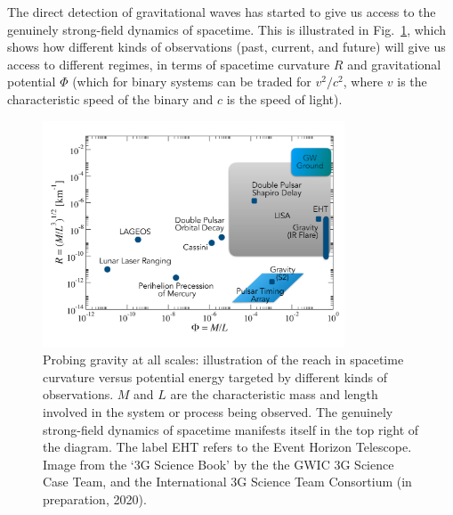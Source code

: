The direct detection of gravitational waves has started to give us access to the genuinely
strong-field dynamics of spacetime. This is illustrated in Fig.~\ref{fig:phasediagram}, which shows how 
different kinds of observations (past, current, and future) will give us access to different
regimes, in terms of spacetime curvature $R$ and gravitational potential $\Phi$ (which for binary 
systems can be traded for $v^2/c^2$, where $v$ is the characteristic speed of the binary and $c$
is the speed of light). 

\begin{figure}[t]
\centering
\includegraphics[width=0.8\textwidth]{Figures/ToG2_reduce.pdf}
\caption{\small Probing gravity at all scales: illustration of the reach in spacetime curvature versus potential energy targeted by different  kinds of observations. 
$M$ and $L$ are the characteristic mass and length involved in the system or process being observed. 
The genuinely strong-field dynamics of spacetime manifests itself in the top right of the diagram. The label EHT refers to the Event Horizon Telescope.
Image from the `3G Science Book' by the the GWIC 3G Science Case Team, and the International 3G Science Team Consortium (in preparation, 2020).
}
\label{fig:phasediagram}
\end{figure}

